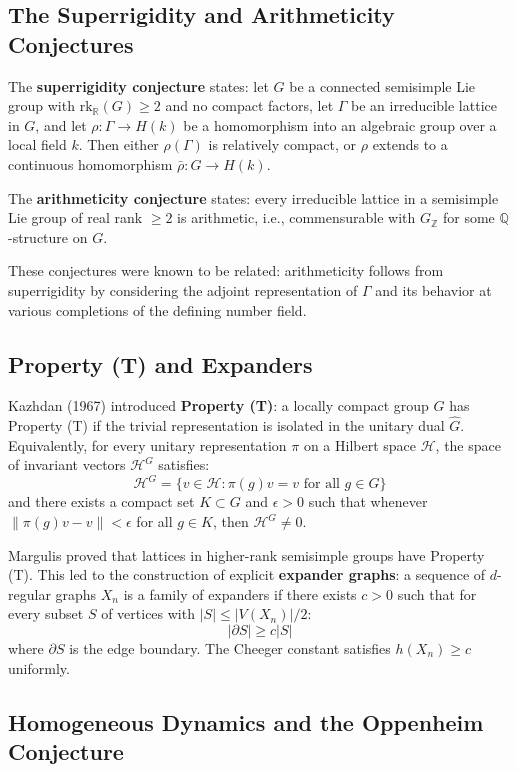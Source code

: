 \subsection{The Superrigidity and Arithmeticity Conjectures}

The \textbf{superrigidity conjecture} states: let $G$ be a connected
semisimple Lie group with $\mathrm{rk}_{\mathbb{R}}(G) \ge 2$ and no
compact factors, let $\Gamma$ be an irreducible lattice in $G$, and let
$\rho: \Gamma \to H(k)$ be a homomorphism into an algebraic group over
a local field $k$. Then either $\rho(\Gamma)$ is relatively compact, or
$\rho$ extends to a continuous homomorphism $\bar{\rho}: G \to H(k)$.

The \textbf{arithmeticity conjecture} states: every irreducible lattice
in a semisimple Lie group of real rank $\ge 2$ is arithmetic, i.e.,
commensurable with $G_{\mathbb{Z}}$ for some $\mathbb{Q}$-structure on $G$.

These conjectures were known to be related: arithmeticity follows from
superrigidity by considering the adjoint representation of $\Gamma$ and
its behavior at various completions of the defining number field.

\subsection{Property (T) and Expanders}

Kazhdan (1967) introduced \textbf{Property (T)}: a locally compact
group $G$ has Property (T) if the trivial representation is isolated
in the unitary dual $\hat{G}$. Equivalently, for every unitary
representation $\pi$ on a Hilbert space $\mathcal{H}$, the space of
invariant vectors $\mathcal{H}^G$ satisfies:
\[\mathcal{H}^G = \{v \in \mathcal{H} : \pi(g)v = v \text{ for all } g \in G\}\]
and there exists a compact set $K \subset G$ and $\epsilon > 0$ such
that whenever $\|\pi(g)v - v\| < \epsilon$ for all $g \in K$, then
$\mathcal{H}^G \neq 0$.

Margulis proved that lattices in higher-rank semisimple groups have
Property (T). This led to the construction of explicit \textbf{expander
graphs}: a sequence of $d$-regular graphs $X_n$ is a family of expanders
if there exists $c > 0$ such that for every subset $S$ of vertices with
$|S| \leq |V(X_n)|/2$:
\[|\partial S| \geq c|S|\]
where $\partial S$ is the edge boundary. The Cheeger constant satisfies
$h(X_n) \geq c$ uniformly.

\subsection{Homogeneous Dynamics and the Oppenheim Conjecture}


